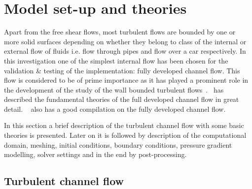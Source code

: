 \newpage

\section{Model set-up and theories} 
Apart from the free shear flows, most turbulent flows are bounded by one or more solid surfaces depending on whether they belong to class of the internal or external flow of fluids i.e. flow through pipes and flow over a car respectively.  In this investigation one of the simplest internal flow has been chosen for the validation \& testing of the implementation: fully developed channel flow. This flow is considered to be of prime importance as it has played a prominent role in the development of the study of the wall bounded turbulent flows~\cite{pope:book}.~\cite{pope:book} has described the fundamental theories of the full developed channel flow in great detail. ~\cite{froehlich:book} also has a good compilation on the fully developed channel flow. 

In this section a brief description of the turbulent channel flow with some basic theories is presented. Later on it is followed by description of the computational domain, meshing, initial conditions, boundary conditions, pressure gradient modelling, solver settings and in the end by post-processing. 

\subsection{Turbulent channel flow} \label{validation}

